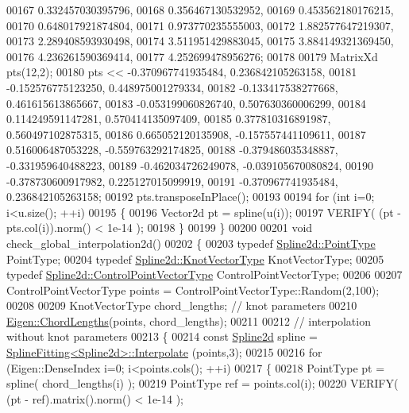 \begin{DoxyCode}
00167     0.332457030395796,
00168     0.356467130532952,
00169     0.453562180176215,
00170     0.648017921874804,
00171     0.973770235555003,
00172     1.882577647219307,
00173     2.289408593930498,
00174     3.511951429883045,
00175     3.884149321369450,
00176     4.236261590369414,
00177     4.252699478956276;
00178 
00179   MatrixXd pts(12,2);
00180   pts << -0.370967741935484,   0.236842105263158,
00181     -0.152576775123250,   0.448975001279334,
00182     -0.133417538277668,   0.461615613865667,
00183     -0.053199060826740,   0.507630360006299,
00184     0.114249591147281,   0.570414135097409,
00185     0.377810316891987,   0.560497102875315,
00186     0.665052120135908,  -0.157557441109611,
00187     0.516006487053228,  -0.559763292174825,
00188     -0.379486035348887,  -0.331959640488223,
00189     -0.462034726249078,  -0.039105670080824,
00190     -0.378730600917982,   0.225127015099919,
00191     -0.370967741935484,   0.236842105263158;
00192   pts.transposeInPlace();
00193 
00194   \textcolor{keywordflow}{for} (\textcolor{keywordtype}{int} i=0; i<u.size(); ++i)
00195   \{
00196     Vector2d pt = spline(u(i));
00197     VERIFY( (pt - pts.col(i)).norm() < 1e-14 );
00198   \}
00199 \}
00200 
00201 \textcolor{keywordtype}{void} check\_global\_interpolation2d()
00202 \{
00203   \textcolor{keyword}{typedef} \hyperlink{group___splines___module_a9ade8a2f81dae6eedb8845cb080672bd}{Spline2d::PointType} PointType;
00204   \textcolor{keyword}{typedef} \hyperlink{group___splines___module_a066f7a8b120316c9068b559f0790e9ec}{Spline2d::KnotVectorType} KnotVectorType;
00205   \textcolor{keyword}{typedef} \hyperlink{group___splines___module_ac42c673462a98ad1779761bebeb450bf}{Spline2d::ControlPointVectorType} ControlPointVectorType;
00206 
00207   ControlPointVectorType points = ControlPointVectorType::Random(2,100);
00208 
00209   KnotVectorType chord\_lengths; \textcolor{comment}{// knot parameters}
00210   \hyperlink{group___splines___module_ga1b4cbde5d98411405871accf877552d2}{Eigen::ChordLengths}(points, chord\_lengths);
00211 
00212   \textcolor{comment}{// interpolation without knot parameters}
00213   \{
00214     \textcolor{keyword}{const} \hyperlink{namespace_eigen_aad3d357fe2fef560e7d8e592fb215fbf}{Spline2d} spline = \hyperlink{group___splines___module_adc80b6f0dd0dbbea28130fb254626874}{SplineFitting<Spline2d>::Interpolate}
      (points,3);  
00215 
00216     \textcolor{keywordflow}{for} (Eigen::DenseIndex i=0; i<points.cols(); ++i)
00217     \{
00218       PointType pt = spline( chord\_lengths(i) );
00219       PointType ref = points.col(i);
00220       VERIFY( (pt - ref).matrix().norm() < 1e-14 );

\end{DoxyCode}
